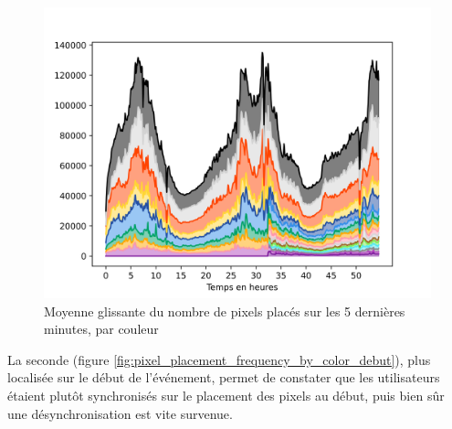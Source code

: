 \documentclass[a4paper]{article}
\begin{document}
{\begin{figure}[h]
    \centering
    \includegraphics[width=.80\linewidth]{pixel_placement_frequency_by_color_global.png}
    \caption{Moyenne glissante du nombre de pixels placés sur les 5 dernières minutes, par couleur}
    \label{fig:pixel_placement_frequency_by_color_global}
\end{figure}

\newpage 

La seconde (figure \ref{fig:pixel_placement_frequency_by_color_debut}), plus localisée sur le début de l'événement, permet de constater que les utilisateurs étaient plutôt synchronisés sur le placement des pixels au début, puis bien sûr une désynchronisation est vite survenue.

}
\end{document}
